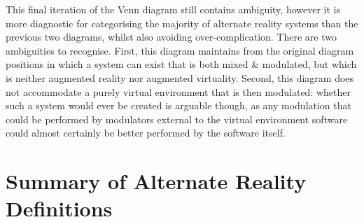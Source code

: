 This final iteration of the Venn diagram still contains ambiguity, however it is more diagnostic for categorising the majority of alternate reality systems than the previous two diagrams, whilst also avoiding over-complication. There are two ambiguities to recognise. First, this diagram maintains from the original diagram positions in which a system can exist that is both mixed \& modulated, but which is neither augmented reality nor augmented virtuality. Second, this diagram does not accommodate a purely virtual environment that is then modulated: whether such a system would ever be created is arguable though, as any modulation that could be performed by modulators external to the virtual environment software could almost certainly be better performed by the software itself.



\section{Summary of Alternate Reality Definitions}
\label{summaryofalternaterealitydefinitions}



